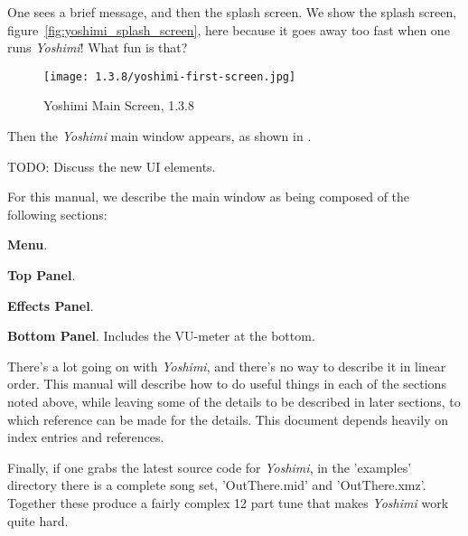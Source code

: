 \documentclass[
 11pt,
 twoside,
 a4paper,
 headinclude,
 footinclude,
 final                                 %
]{article}
\begin{document}
   One sees a brief message, and then the splash screen.
   We show the splash screen, figure~\ref{fig:yoshimi_splash_screen},
   here because it goes away too
   fast when one runs \textsl{Yoshimi}!
   What fun is that?

\begin{figure}[H]
   \centering 
   \texttt{[image: 1.3.8/yoshimi-first-screen.jpg]}
   \caption{Yoshimi Main Screen, 1.3.8}
   \label{fig:yoshimi_main_screen}
\end{figure}

   
   Then the \textsl{Yoshimi} main window appears, as shown in
   .

   TODO:  Discuss the new UI elements.

   For this manual, we describe the main window as being composed of
   the following sections:

\begin{enumber}
   \item \textbf{Menu}.
   \item \textbf{Top Panel}.
   \item \textbf{Effects Panel}.
   \item \textbf{Bottom Panel}.  Includes the VU-meter at the bottom.
\end{enumber}

   There's a lot going on with \textsl{Yoshimi}, and there's no way to describe
   it in linear order.  This manual will describe how to do useful things in
   each of the sections noted above, while leaving some of the details to be
   described in later sections, to which reference can be made for the details.
   This document depends heavily on index entries and references.

   Finally, if one grabs the latest source code for \textsl{Yoshimi}, in the
   'examples' directory there is a complete song set, 'OutThere.mid' and
   'OutThere.xmz'. Together these produce a fairly complex 12 part tune that
   makes \textsl{Yoshimi} work quite hard.




\end{document}

